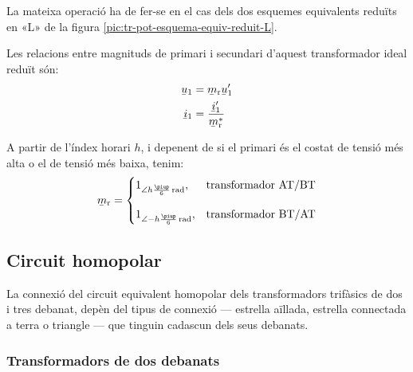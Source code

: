 \break
\begin{center}
    
    \label{fig:esq-reduit-T-complex}
\end{center}

La mateixa operació ha de fer-se en el cas dels dos esquemes equivalents reduïts en «L» de la figura \vref{pic:tr-pot-esquema-equiv-reduit-L}.

Les relacions entre magnituds de primari i secundari d'aquest transformador ideal reduït són:
\begin{subequations}
\begin{align}
    \cmplx{u}_1 &= \cmplx{m}\ped{r}\cmplx{u}'_1 \label{eq:UmU-reduit}\\
    \cmplx{i}_1 &= \frac{\cmplx{i}'_1}{\cmplx{m}^*\ped{r}} \label{eq:ImI-reduit}
\end{align}
\end{subequations}

A partir de l'índex horari $h$, i depenent de si el primari és el costat de tensió més alta o el de tensió més baixa, tenim:
\begin{equation}
\cmplx{m}\ped{r} = \begin{cases}
      1_{\angle h\frac{\piup}{6}\unit{\,rad}}, & \text{transformador AT/BT}\\[2.7ex]
      1_{\angle -h\frac{\piup}{6}\unit{\,rad}}, & \text{transformador BT/AT}
\end{cases}
\label{eq:rel-transf-cmplx-reduit}
\end{equation}


\subsection{Circuit homopolar}\label{sec:circuit_homopolar}

La connexió del circuit equivalent homopolar dels transformadors trifàsics de dos i tres debanat, depèn del tipus de connexió --- estrella aïllada, estrella connectada a terra o triangle --- que tinguin cadascun dels seus debanats.

\subsubsection{Transformadors de dos debanats}\label{sec:cir-hom-2-deb}


